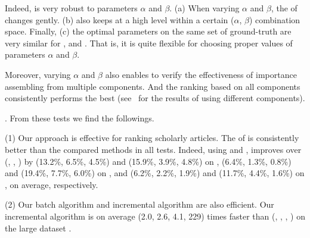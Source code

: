 Indeed, \ensemblerank is very robust to parameters $\alpha$ and $\beta$.
(a) When varying $\alpha$ and $\beta$, the \PairAcc of \ensemblerank changes gently. (b) \PairAcc also keeps at a high level within a certain ($\alpha$, $\beta$)  combination space. Finally, (c) the optimal parameters on the same set of ground-truth are very similar for \aan, \aminer and \magdata. That is, it is quite flexible for choosing proper values
of  parameters $\alpha$ and $\beta$.

Moreover, varying $\alpha$ and $\beta$ also enables to verify the effectiveness of importance assembling from multiple components.
And the ranking based on all components consistently performs the best (see~\cite{SARank-full} for the results of using different components).



.
From these tests we find the followings.


\noindent(1) Our approach \ensemblerank is effective for ranking scholarly articles. %
The \PairAcc of \ensemblerank is consistently better than the compared methods in all tests. Indeed, using \recom and \fcita, \ensemblerank improves \PairAcc over (\pagerank, \futurerank, \hhgrank) by
(13.2\%, 6.5\%, 4.5\%) and (15.9\%, 3.9\%, 4.8\%) on \aan,
(6.4\%, 1.3\%, 0.8\%) and (19.4\%, 7.7\%, 6.0\%) on \aminer, and
(6.2\%, 2.2\%, 1.9\%) and (11.7\%, 4.4\%, 1.6\%) on \magdata, on average, respectively.


\noindent(2) Our batch algorithm \batensemble and incremental algorithm \incensemble are also efficient.
%
Our incremental algorithm \incensemble is on average (2.0, 2.6, 4.1, 229) times faster than (\batensemble, \powensemble, \futurerank, \hhgrank)  on the large dataset \magdata.

